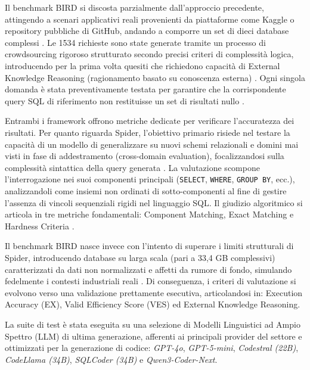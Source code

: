 Il benchmark BIRD si discosta parzialmente dall'approccio precedente,
attingendo a scenari applicativi reali provenienti da piattaforme come
Kaggle o repository pubbliche di GitHub, andando a comporre un set di
dieci database complessi \cite{3666122.3667957}. Le 1534 richieste sono state generate tramite
un processo di crowdsourcing rigoroso strutturato secondo precisi
criteri di complessità logica, introducendo per la prima volta quesiti
che richiedono capacità di External Knowledge Reasoning
(ragionamento basato su conoscenza esterna) \cite{3666122.3667957}. Ogni singola domanda è
stata preventivamente testata per garantire che la corrispondente query
SQL di riferimento non restituisse un set di risultati nullo \cite{3666122.3667957}.

Entrambi i framework offrono metriche dedicate per verificare
l'accuratezza dei risultati. Per quanto riguarda Spider, l'obiettivo
primario risiede nel testare la capacità di un modello di generalizzare
su nuovi schemi relazionali e domini mai visti in fase di addestramento
(cross-domain evaluation), focalizzandosi sulla complessità
sintattica della query generata \cite{yu2019spiderlargescalehumanlabeleddataset}. La valutazione scompone
l'interrogazione nei suoi componenti principali (\texttt{SELECT},
\texttt{WHERE}, \texttt{GROUP\ BY}, ecc.), analizzandoli come insiemi
non ordinati di sotto-componenti al fine di gestire l'assenza di vincoli
sequenziali rigidi nel linguaggio SQL. Il giudizio algoritmico si
articola in tre metriche fondamentali: Component Matching, Exact
Matching e Hardness Criteria \cite{yu2019spiderlargescalehumanlabeleddataset}.

Il benchmark BIRD nasce invece con l'intento di superare i limiti
strutturali di Spider, introducendo database su larga scala (pari a 33,4
GB complessivi) caratterizzati da dati non normalizzati e affetti da
rumore di fondo, simulando fedelmente i contesti industriali reali \cite{3666122.3667957}. Di
conseguenza, i criteri di valutazione si evolvono verso una validazione
prettamente esecutiva, articolandosi in: Execution Accuracy (EX), Valid
Efficiency Score (VES) ed External Knowledge Reasoning\cite{3666122.3667957}.

La suite di test è stata eseguita su una selezione di Modelli
Linguistici ad Ampio Spettro (LLM) di ultima generazione, afferenti ai
principali provider del settore e ottimizzati per la generazione di
codice: \emph{GPT-4o}, \emph{GPT-5-mini}, \emph{Codestral (22B)},
\emph{CodeLlama (34B)}, \emph{SQLCoder (34B)} e \emph{Qwen3-Coder-Next}.

